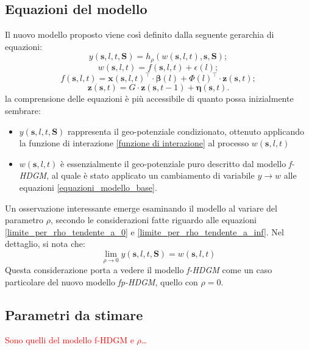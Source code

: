 \subsection[Equazioni del modello]{Equazioni del modello}
Il nuovo modello proposto viene così definito dalla seguente gerarchia di equazioni:
\begin{equation}
	y(\mathbf{s}, l, t,\mathbf{S}) = h_\rho(w(\mathbf{s}, l, t), \mathbf{s}, \mathbf{S});
	\label{eq_rumore_uscita}
\end{equation}
\begin{equation}
	w(\mathbf{s}, l, t)= f(\mathbf{s}, l, t) + \epsilon(l);
	\label{eq_rumore_uscita}
\end{equation}
\begin{equation}
	f(\mathbf{s}, l, t) = \mathbf{x}(\mathbf{s}, l, t)^\top\cdot\boldsymbol{\beta}(l) + \Phi(l)^\top\cdot\mathbf{z}(\mathbf{s}, t);
	\label{eq_comp_det}
\end{equation}
\begin{equation}
	\mathbf{z}(\mathbf{s}, t) = G\cdot \mathbf{z}(\mathbf{s}, t-1) + \boldsymbol{\eta}(\mathbf{s}, t).
	\label{eq_comp_lat}
\end{equation}
la comprensione delle equazioni è più accessibile di quanto possa inizialmente sembrare:
\begin{itemize}
	\item $y(\mathbf{s}, l, t,\mathbf{S})$ rappresenta il geo-potenziale condizionato, ottenuto applicando la funzione di interazione \ref{funzione di interazione} al processo $w(\mathbf{s}, l, t)$ 
	\item $w(\mathbf{s}, l, t)$ è essenzialmente il geo-potenziale puro descritto dal modello \textit{f-HDGM}, al quale è stato applicato un cambiamento di variabile $y \longrightarrow w$ alle equazioni \ref{equazioni_modello_base}.
\end{itemize}
Un osservazione interessante emerge esaminando il modello al variare del parametro $\rho$, secondo le considerazioni fatte riguardo alle equazioni \ref{limite_per_rho_tendente_a_0} e \ref{limite_per_rho_tendente_a_inf}. Nel dettaglio, si nota che:
\begin{equation}
	\lim_{\rho \to 0} y(\mathbf{s}, l, t,\mathbf{S}) = w(\mathbf{s}, l, t)
\end{equation}
Questa considerazione porta a vedere il modello \textit{f-HDGM} come un caso particolare del nuovo modello \textit{fp-HDGM}, quello con $\rho=0$.
\subsection[Parametri da stimare]{Parametri da stimare}
\textcolor{red}{Sono quelli del modello f-HDGM e $\rho$\dots}


